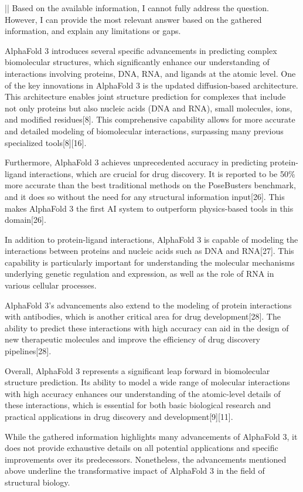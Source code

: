 \documentclass[11pt]{article}
\begin{document}
\begin{showcase}[title=Topic: AlphaFold 3]
||
Based on the available information, I cannot fully address the question. However, I can provide the most relevant answer based on the gathered information, and explain any limitations or gaps.

AlphaFold 3 introduces several specific advancements in predicting complex biomolecular structures, which significantly enhance our understanding of interactions involving proteins, DNA, RNA, and ligands at the atomic level. One of the key innovations in AlphaFold 3 is the updated diffusion-based architecture. This architecture enables joint structure prediction for complexes that include not only proteins but also nucleic acids (DNA and RNA), small molecules, ions, and modified residues[8]. This comprehensive capability allows for more accurate and detailed modeling of biomolecular interactions, surpassing many previous specialized tools[8][16].

Furthermore, AlphaFold 3 achieves unprecedented accuracy in predicting protein-ligand interactions, which are crucial for drug discovery. It is reported to be 50\% more accurate than the best traditional methods on the PoseBusters benchmark, and it does so without the need for any structural information input[26]. This makes AlphaFold 3 the first AI system to outperform physics-based tools in this domain[26].

In addition to protein-ligand interactions, AlphaFold 3 is capable of modeling the interactions between proteins and nucleic acids such as DNA and RNA[27]. This capability is particularly important for understanding the molecular mechanisms underlying genetic regulation and expression, as well as the role of RNA in various cellular processes.

AlphaFold 3's advancements also extend to the modeling of protein interactions with antibodies, which is another critical area for drug development[28]. The ability to predict these interactions with high accuracy can aid in the design of new therapeutic molecules and improve the efficiency of drug discovery pipelines[28].

Overall, AlphaFold 3 represents a significant leap forward in biomolecular structure prediction. Its ability to model a wide range of molecular interactions with high accuracy enhances our understanding of the atomic-level details of these interactions, which is essential for both basic biological research and practical applications in drug discovery and development[9][11].

While the gathered information highlights many advancements of AlphaFold 3, it does not provide exhaustive details on all potential applications and specific improvements over its predecessors. Nonetheless, the advancements mentioned above underline the transformative impact of AlphaFold 3 in the field of structural biology.


\end{showcase}
\end{document}
